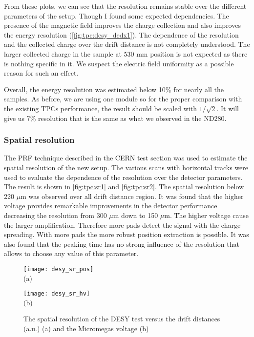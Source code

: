 \documentclass[../main.tex]{subfiles}
\begin{document}
From these plots, we can see that the resolution remains stable over the different parameters of the setup. Though I found some expected dependencies. The presence of the magnetic field improves the charge collection and also improves the energy resolution (\autoref{fig:tpc:desy_dedx1}). The dependence of the resolution and the collected charge over the drift distance is not completely understood. The larger collected charge in the sample at 530 mm position is not expected as there is nothing specific in it. We suspect the electric field uniformity as a possible reason for such an effect.

Overall, the energy resolution was estimated below 10\% for nearly all the samples. As before, we are using one module so for the proper comparison with the existing TPCs performance, the result should be scaled with $1/\sqrt{2}$. It will give us 7\% resolution that is the same as what we observed in the ND280.

\subsubsection{Spatial resolution}
The PRF technique described in the CERN test section was used to estimate the spatial resolution of the new setup. The various scans with horizontal tracks were used to evaluate the dependence of the resolution over the detector parameters. The result is shown in \autoref{fig:tpc:sr1} and \autoref{fig:tpc:sr2}. The spatial resolution below 220 $\mu$m was observed over all drift distance region. It was found that the higher voltage provides remarkable improvements in the detector performance decreasing the resolution from 300 $\mu$m down to 150 $\mu$m. The higher voltage cause the larger amplification. Therefore more pads detect the signal with the charge spreading. With more pads the more robust position extraction is possible. It was also found that the peaking time has no strong influence of the resolution that allows to choose any value of this parameter.

\begin{figure}[!ht]
  \centering
  \begin{minipage}{0.49\linewidth}
    \centering
    \texttt{[image: desy\_sr\_pos]} \\ (a)
  \end{minipage}
  \begin{minipage}{0.49\linewidth}
    \centering
    \texttt{[image: desy\_sr\_hv]} \\ (b)
  \end{minipage}
  \caption{The spatial resolution of the DESY test versus the drift distances (a.u.) (a) and the Micromegas voltage (b)}
  \label{fig:tpc:sr1}
\end{figure}
\end{document}
